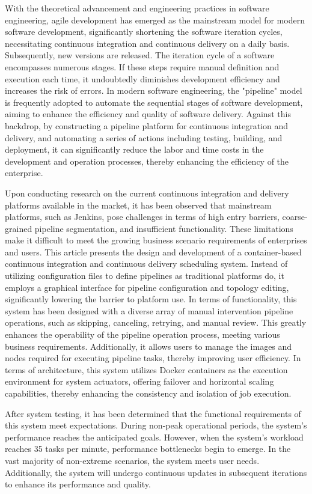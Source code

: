 \begin{abstract*}
  With the theoretical advancement and engineering practices in software engineering, agile development has emerged as the mainstream model for modern software development, significantly shortening the software iteration cycles, necessitating continuous integration and continuous delivery on a daily basis.
  Subsequently, new versions are released. The iteration cycle of a software encompasses numerous stages.  If these steps require manual definition and execution each time, it undoubtedly diminishes development efficiency and increases the risk of errors.
  In modern software engineering, the "pipeline" model is frequently adopted to automate the sequential stages of software development, aiming to enhance the efficiency and quality of software delivery.
  Against this backdrop, by constructing a pipeline platform for continuous integration and delivery, and automating a series of actions including testing, building, and deployment, it can significantly reduce the labor and time costs in the development and operation processes, thereby enhancing the efficiency of the enterprise.
  
  Upon conducting research on the current continuous integration and delivery platforms available in the market, it has been observed that mainstream platforms, such as Jenkins, pose challenges in terms of high entry barriers, coarse-grained pipeline segmentation, and insufficient functionality.  These limitations make it difficult to meet the growing business scenario requirements of enterprises and users.
  This article presents the design and development of a container-based continuous integration and continuous delivery scheduling system.  Instead of utilizing configuration files to define pipelines as traditional platforms do, it employs a graphical interface for pipeline configuration and topology editing, significantly lowering the barrier to platform use.
  In terms of functionality, this system has been designed with a diverse array of manual intervention pipeline operations, such as skipping, canceling, retrying, and manual review.  This greatly enhances the operability of the pipeline operation process, meeting various business requirements.  Additionally, it allows users to manage the images and nodes required for executing pipeline tasks, thereby improving user efficiency.
  In terms of architecture, this system utilizes Docker containers as the execution environment for system actuators, offering failover and horizontal scaling capabilities, thereby enhancing the consistency and isolation of job execution.
  
  After system testing, it has been determined that the functional requirements of this system meet expectations.  During non-peak operational periods, the system's performance reaches the anticipated goals.  However, when the system's workload reaches 35 tasks per minute, performance bottlenecks begin to emerge.
  In the vast majority of non-extreme scenarios, the system meets user needs. Additionally, the system will undergo continuous updates in subsequent iterations to enhance its performance and quality.
\end{abstract*}
